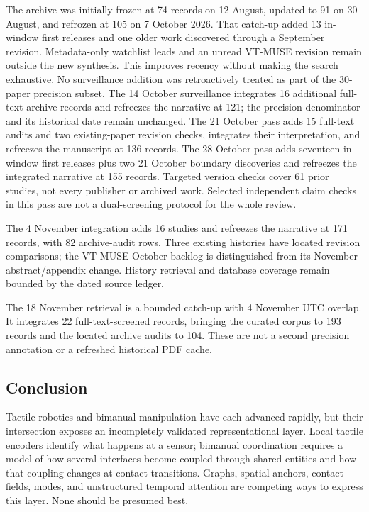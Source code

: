 The archive was initially frozen at 74 records on 12 August, updated to 91 on
30 August, and refrozen at 105 on 7 October 2026. That catch-up added
13 in-window first releases and one older work discovered through a September
revision. Metadata-only watchlist leads and an unread VT-MUSE revision remain
outside the new synthesis. This improves recency without making the search
exhaustive. No surveillance addition was retroactively treated as part of the
30-paper precision subset. The 14 October surveillance integrates 16 additional
full-text archive records and refreezes the narrative at 121; the precision
denominator and its historical date remain unchanged. The 21 October pass
adds 15 full-text audits and two existing-paper revision checks, integrates their
interpretation, and refreezes the manuscript at 136 records. The 28 October pass
adds seventeen in-window first releases plus two 21 October boundary discoveries
and refreezes the integrated narrative at 155 records. Targeted version checks
cover 61 prior studies, not every publisher or archived work. Selected independent
claim checks in this pass are not a dual-screening protocol for the whole review.

The 4 November integration adds 16 studies and refreezes the narrative at
171 records, with 82 archive-audit rows. Three existing histories have located
revision comparisons; the VT-MUSE October backlog is distinguished from its
November abstract/appendix change. History retrieval and database coverage
remain bounded by the dated source ledger.

The 18 November retrieval is a bounded catch-up with 4 November UTC overlap.
It integrates 22 full-text-screened records, bringing the curated corpus to
193 records and the located archive audits to 104. These are not a second
precision annotation or a refreshed historical PDF cache.

\subsection{Conclusion}

Tactile robotics and bimanual manipulation have each advanced rapidly, but their
intersection exposes an incompletely validated representational layer. Local
tactile encoders
identify what happens at a sensor; bimanual coordination requires a model of how
several interfaces become coupled through shared entities and how that coupling
changes at contact transitions. Graphs, spatial anchors, contact fields, modes,
and unstructured temporal attention are competing ways to express this layer.
None should be presumed best.

